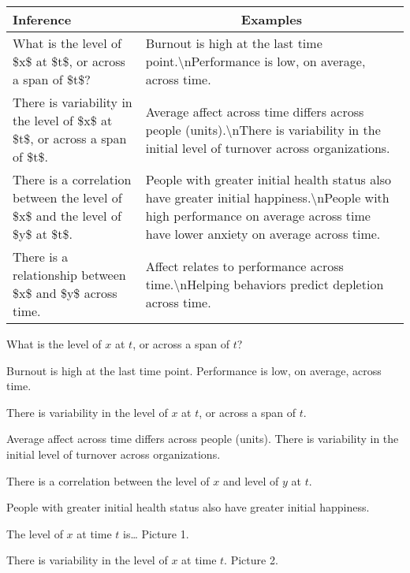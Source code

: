 \documentclass[]{article}
\begin{document}
\begin{table}[tbp]
\begin{center}
\begin{threeparttable}
\caption{\label{tab:unnamed-chunk-1}}
\begin{tabular}{ll}
\toprule
Inference & \multicolumn{1}{c}{Examples}\\
\midrule
What is the level of \$x\$ at \$t\$, or across a span of \$t\$? & Burnout is high at the last time point.\textbackslash{}nPerformance is low, on average, across time.\\
There is variability in the level of \$x\$ at \$t\$, or across a span of \$t\$. & Average affect across time differs across people (units).\textbackslash{}nThere is variability in the initial level of turnover across organizations.\\
There is a correlation between the level of \$x\$ and the level of \$y\$ at \$t\$. & People with greater initial health status also have greater initial happiness.\textbackslash{}nPeople with high performance on average across time have lower anxiety on average across time.\\
There is a relationship between \$x\$ and \$y\$ across time. & Affect relates to performance across time.\textbackslash{}nHelping behaviors predict depletion across time.\\
\bottomrule
\end{tabular}
\end{threeparttable}
\end{center}
\end{table}

What is the level of \(x\) at \(t\), or across a span of \(t\)?

Burnout is high at the last time point. Performance is low, on average,
across time.

There is variability in the level of \(x\) at \(t\), or across a span of
\(t\).

Average affect across time differs across people (units). There is
variability in the initial level of turnover across organizations.

There is a correlation between the level of \(x\) and level of \(y\) at
\(t\).

People with greater initial health status also have greater initial
happiness.

The level of \(x\) at time \(t\) is\ldots{} Picture 1.

There is variability in the level of \(x\) at time \(t\). Picture 2.
\end{document}

